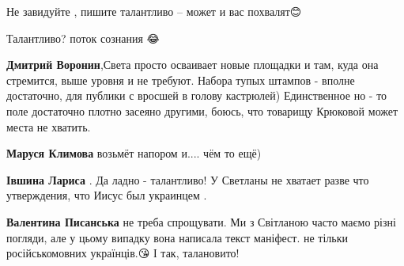 \begin{itemize}
\begin{itemize}
Не завидуйте , пишите талантливо -- может и вас похвалят😊

 
Талантливо? поток сознания 😂

 
\textbf{Дмитрий Воронин},Света просто осваивает новые площадки и там, куда она стремится, выше уровня и не требуют. Набора тупых штампов - вполне достаточно, для публики с вросшей в голову кастрюлей)
Единственное но - то поле достаточно плотно засеяно другими, боюсь, что товарищу Крюковой может места не хватить.

 
\textbf{Маруся Климова} возьмёт напором и.... чём то ещё)

 
\textbf{Івшина Лариса} . Да ладно - талантливо! У Светланы не хватает разве что утверждения, что Иисус был украинцем .

 

\textbf{Валентина Писанська} не треба спрощувати. Ми з Світланою часто маємо
різні погляди, але у цьому випадку вона написала текст маніфест. не тільки
російськомовних українців.😘 І так, талановито!

 


\end{itemize}
\end{itemize}
